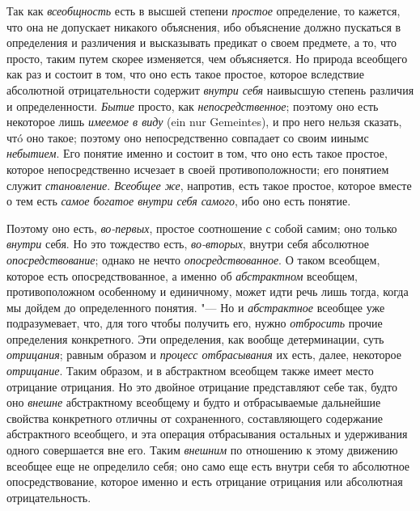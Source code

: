 Так как {\em всеобщность}
есть в высшей степени
{\em простое}
определение, то кажется, что она не допускает никакого
объяснения, ибо объяснение должно пускаться в определения и различения и
высказывать предикат о своем предмете, а то, что просто,
таким путем скорее изменяется, чем объясняется. Но природа
всеобщего как раз и состоит в том, что оно есть такое простое, которое
вследствие абсолютной отрицательности содержит
{\em внутри себя}
наивысшую степень различия и определенности.
{\em Бытие} просто, как
{\em непосредственное};
поэтому оно есть некоторое лишь
{\em имеемое в виду} (ein nur
Gemeintes), и про него нельзя сказать, чтó оно такое; поэтому
оно непосредственно совпадает со своим иинымс
{\em небытием}.
Его понятие именно и состоит в том, что оно есть такое
простое, которое непосредственно исчезает в своей
противоположности; его понятием служит
{\em становление}.
{\em Всеобщее же},
напротив, есть такое простое, которое вместе о тем есть
{\em самое богатое внутри себя самого},
ибо оно есть понятие.

Поэтому оно есть,
{\em во-первых}, простое
соотношение с собой самим; оно только
{\em внутри} себя. Но это
тождество есть, {\em во-вторых},
внутри себя абсолютное
{\em опосредствование};
однако не нечто
{\em опосредствованное}.
О таком всеобщем, которое есть опосредствованное, а именно об
{\em абстрактном}
всеобщем, противоположном особенному и единичному, может идти
речь лишь тогда, когда мы дойдем до определенного понятия. "---
Но и {\em абстрактное}
всеобщее уже подразумевает, что, для того чтобы получить его,
нужно {\em отбросить}
прочие определения конкретного. Эти определения, как вообще
детерминации, суть {\em отрицания};
равным образом и
{\em процесс отбрасывания}
их есть, далее, некоторое
{\em отрицание}. Таким
образом, и в абстрактном всеобщем также имеет место отрицание отрицания. Но
это двойное отрицание представляют себе так, будто оно
{\em внешне} абстрактному
всеобщему и будто и отбрасываемые дальнейшие свойства конкретного отличны
от сохраненного, составляющего содержание абстрактного всеобщего, и эта
операция отбрасывания остальных и удерживания одного совершается вне его.
Таким {\em внешним} по
отношению к этому движению всеобщее еще не определило себя; оно само еще
есть внутри себя то абсолютное опосредствование, которое именно и есть
отрицание отрицания или абсолютная отрицательность.

